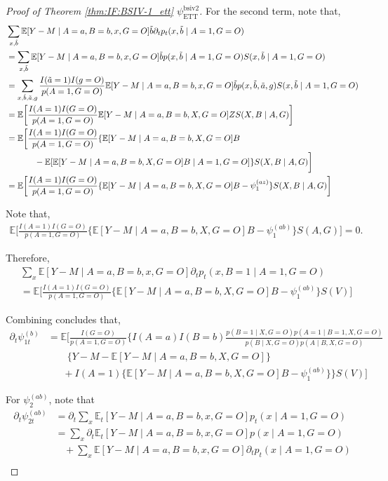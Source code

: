 \documentclass[10pt]{article}
\begin{document}
\begin{proof}[Proof of Theorem \ref{thm:IF:BSIV-1_ett} $\psi_{\text{ETT}}^{\text{bsiv2}}$]
For the second term, note that,
{\footnotesize \begin{align*}
    &\sum_{x,\tilde{b}}\mathbb{E}[Y-M\mid A=a,B=b,x,G=O]\tilde{b}\partial_tp_t(x,\tilde{b}\mid A=1, G=O)\\
    &=\sum_{x,\tilde{b}}\mathbb{E}[Y-M\mid A=a,B=b,x,G=O]\tilde{b}p(x,\tilde{b}\mid A=1, G=O)S(x,\tilde{b}\mid A=1, G=O)\\
    &=\sum_{x,\Tilde{b},\Tilde{a},g}\frac{I(\Tilde{a}=1)I(g=O)}{p(A=1,G=O)}\mathbb{E}[Y-M\mid A=a,B=b,x,G=O]\tilde{b}p(x,\Tilde{b}, \Tilde{a}, g)S(x,\tilde{b}\mid A=1, G=O)\\
    &=\mathbb{E}\bigg[\frac{I(A=1)I(G=O)}{p(A=1,G=O)}\mathbb{E}[Y-M\mid A=a,B=b,X,G=O]ZS(X,B\mid A, G)\bigg]\\
    &=\mathbb{E}\bigg[\frac{I(A=1)I(G=O)}{p(A=1,G=O)}\{\mathbb{E}[Y-M\mid A=a,B=b,X,G=O]B\\
    &~~~~~~~~~~-\mathbb{E}[\mathbb{E}[Y-M\mid A=a,B=b,X,G=O]B\mid A=1, G=O]\}S(X,B\mid A, G)\bigg]\\
    &=\mathbb{E}\bigg[\frac{I(A=1)I(G=O)}{p(A=1,G=O)}\{\mathbb{E}[Y-M\mid A=a,B=b,X,G=O]B-\psi_1^{(az)}\}S(X,B\mid A, G)\bigg]
\end{align*}}

Note that,
\begin{align*}
    \mathbb{E}\bigg[\frac{I(A=1)I(G=O)}{p(A=1,G=O)}\{\mathbb{E}[Y-M\mid A=a,B=b,X,G=O]B-\psi_1^{(ab)}\}S(A, G)\bigg]=0.
\end{align*}

Therefore,
\begin{align*}
    &\sum_{x}\mathbb{E}[Y-M\mid A=a,B=b,x,G=O]\partial_tp_t(x,B=1\mid A=1, G=O)\\
    &=\mathbb{E}\bigg[\frac{I(A=1)I(G=O)}{p(A=1,G=O)}\{\mathbb{E}[Y-M\mid A=a,B=b,X,G=O]B-\psi_1^{(ab)}\}S(V)\bigg]
\end{align*}

Combining concludes that,
\begin{align*}
    \partial_t\psi_{1t}^{(b)}&=\mathbb{E}\bigg[\frac{I(G=O)}{p(A=1,G=O)}\bigg\{I(A=a)I(B=b)\frac{p(B=1\mid X,G=O)p(A=1\mid B=1, X, G=O)}{p(B\mid X,G=O)p(A\mid B, X,G=O)}\\
    &\ \ \ \ \ \ \ \ \ \{Y-M-\mathbb{E}[Y-M\mid A=a,B=b,X,G=O]\}\\
    &\ \ \ \ \ \ \ +I(A=1)\{\mathbb{E}[Y-M\mid A=a,B=b,X,G=O]B-\psi_1^{(ab)}\}\bigg\}S(V)\bigg]
\end{align*}

For $\psi_2^{(ab)}$, note that
\begin{align*}
    \partial_t\psi_{2t}^{(ab)}&=\partial_t\sum_{x}\mathbb{E}_t[Y-M\mid A=a,B=b,x,G=O]p_t(x\mid A=1, G=O)\\
    &=\sum_{x}\partial_t\mathbb{E}_t[Y-M\mid A=a,B=b,x,G=O]p(x\mid A=1, G=O)\\
    &\ \ \ \ + \sum_{x}\mathbb{E}[Y-M\mid A=a,B=b,x,G=O]\partial_tp_t(x\mid A=1, G=O)\\
\end{align*}


\end{proof}
\end{document}
